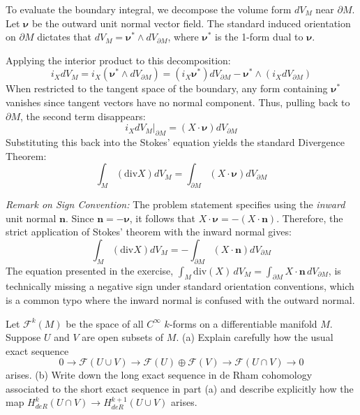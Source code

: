 \begin{solution}
To evaluate the boundary integral, we decompose the volume form $dV_M$ near $\partial M$. Let $\mathbf{\nu}$ be the outward unit normal vector field. The standard induced orientation on $\partial M$ dictates that $dV_M = \mathbf{\nu}^* \wedge dV_{\partial M}$, where $\mathbf{\nu}^*$ is the 1-form dual to $\mathbf{\nu}$.

Applying the interior product to this decomposition:
\[ i_X dV_M = i_X (\mathbf{\nu}^* \wedge dV_{\partial M}) = (i_X \mathbf{\nu}^*) dV_{\partial M} - \mathbf{\nu}^* \wedge (i_X dV_{\partial M}) \]
When restricted to the tangent space of the boundary, any form containing $\mathbf{\nu}^*$ vanishes since tangent vectors have no normal component. Thus, pulling back to $\partial M$, the second term disappears:
\[ i_X dV_M |_{\partial M} = (X \cdot \mathbf{\nu}) dV_{\partial M} \]
Substituting this back into the Stokes' equation yields the standard Divergence Theorem:
\[ \int_M (\mathrm{div} X) dV_M = \int_{\partial M} (X \cdot \mathbf{\nu}) dV_{\partial M} \]

\textit{Remark on Sign Convention:} The problem statement specifies using the \textit{inward} unit normal $\mathbf{n}$. Since $\mathbf{n} = -\mathbf{\nu}$, it follows that $X \cdot \mathbf{\nu} = -(X \cdot \mathbf{n})$. Therefore, the strict application of Stokes' theorem with the inward normal gives:
\[ \int_M (\mathrm{div} X) dV_M = -\int_{\partial M} (X \cdot \mathbf{n}) dV_{\partial M} \]
The equation presented in the exercise, $\int_{M} \mathrm{div}(X)\, dV_{M} = \int_{\partial M} X \cdot \mathbf{n}\, dV_{\partial M}$, is technically missing a negative sign under standard orientation conventions, which is a common typo where the inward normal is confused with the outward normal.
\end{solution}

\begin{exercise}
\label{geometry:2011:10}
Let $\mathcal{F}^{k}(M)$ be the space of all $C^{\infty}$ $k$-forms on a differentiable manifold $M$. Suppose $U$ and $V$ are open subsets of $M$.
(a) Explain carefully how the usual exact sequence
\[ 0 \longrightarrow \mathcal{F}(U \cup V) \longrightarrow \mathcal{F}(U) \oplus \mathcal{F}(V) \longrightarrow \mathcal{F}(U \cap V) \longrightarrow 0 \]
arises.
(b) Write down the long exact sequence in de Rham cohomology associated to the short exact sequence in part (a) and describe explicitly how the map $H_{de R}^{k}(U \cap V) \longrightarrow H_{de R}^{k+1}(U \cup V)$ arises.
\end{exercise}

